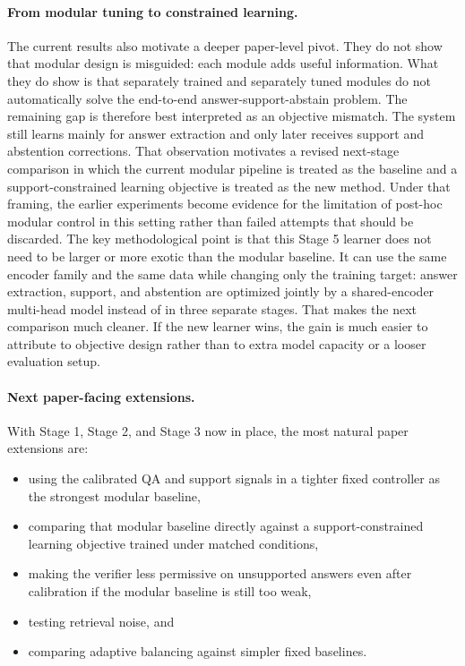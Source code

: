\paragraph{From modular tuning to constrained learning.}
The current results also motivate a deeper paper-level pivot.
They do not show that modular design is misguided:
each module adds useful information.
What they do show is that separately trained and separately tuned modules do
not automatically solve the end-to-end answer-support-abstain problem.
The remaining gap is therefore best interpreted as an objective mismatch.
The system still learns mainly for answer extraction and only later receives
support and abstention corrections.
That observation motivates a revised next-stage comparison in which the current
modular pipeline is treated as the baseline and a support-constrained learning
objective is treated as the new method.
Under that framing, the earlier experiments become evidence for the limitation
of post-hoc modular control in this setting rather than failed attempts that
should be discarded.
The key methodological point is that this Stage 5 learner does not need to be
larger or more exotic than the modular baseline.
It can use the same encoder family and the same data while changing only the
training target:
answer extraction, support, and abstention are optimized jointly by a
shared-encoder multi-head model instead of in three separate stages.
That makes the next comparison much cleaner.
If the new learner wins, the gain is much easier to attribute to objective
design rather than to extra model capacity or a looser evaluation setup.

\paragraph{Next paper-facing extensions.}
With Stage 1, Stage 2, and Stage 3 now in place, the most natural paper
extensions are:
\begin{itemize}[leftmargin=1.25em]
  \item using the calibrated QA and support signals in a tighter fixed
  controller as the strongest modular baseline,
  \item comparing that modular baseline directly against a
  support-constrained learning objective trained under matched conditions,
  \item making the verifier less permissive on unsupported answers even after
  calibration if the modular baseline is still too weak,
  \item testing retrieval noise, and
  \item comparing adaptive balancing against simpler fixed baselines.
\end{itemize}
